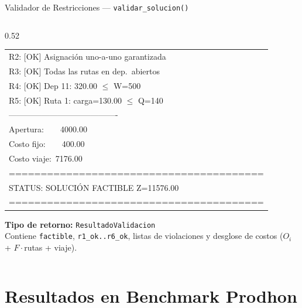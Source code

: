 \documentclass[aspectratio=169,10pt]{beamer}
\newcommand{\tc}[1]{\texttt{\small #1}}
\begin{document}
\begin{frame}{Validador de Restricciones --- \tc{validar\_solucion()}}
\begin{columns}[T,onlytextwidth]
\begin{column}{0.52\textwidth}
{\begin{tabular}{@{}l@{}}
      R2: [OK]  Asignación uno-a-uno garantizada\\
      R3: [OK]  Todas las rutas en dep.\ abiertos\\
      R4: [OK]  Dep 11: 320.00 $\leq$ W=500\\
      R5: [OK]  Ruta 1: carga=130.00 $\leq$ Q=140\\
      ----------------------------------------\\
      Apertura:\ \ \ \ 4000.00\\
      Costo fijo:\ \ \ \ 400.00\\
      Costo viaje:\ 7176.00\\
      ========================================\\
      STATUS: SOLUCIÓN FACTIBLE  Z=11576.00\\
      ========================================\\
      \end{tabular}}

      \vspace{0.3em}
      \small\textbf{Tipo de retorno:} \tc{ResultadoValidacion}\\
      \footnotesize Contiene \tc{factible}, \tc{r1\_ok..r6\_ok},
      listas de violaciones y desglose de costos
      ($O_i$ + $F{\cdot}$rutas + viaje).
    \end{column}
  \end{columns}
\end{frame}

\section{Resultados en Benchmark Prodhon}
\end{document}
